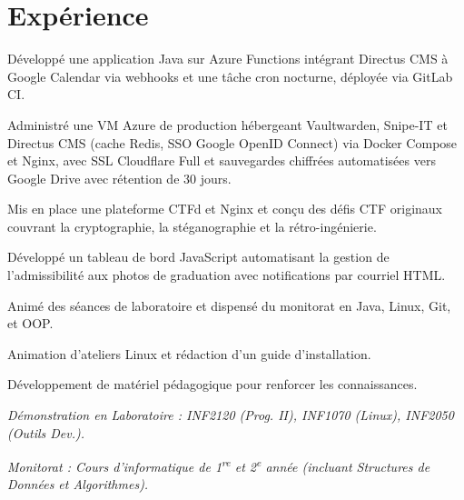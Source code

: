 \documentclass[letterpaper,10pt]{article}
\begin{document}
\section{Expérience}


\begin{resume_list}
\item Développé une application Java sur Azure Functions intégrant Directus CMS à Google Calendar via webhooks et une tâche cron nocturne, déployée via GitLab CI.
\item Administré une VM Azure de production hébergeant Vaultwarden, Snipe-IT et Directus CMS (cache Redis, SSO Google OpenID Connect) via Docker Compose et Nginx, avec SSL Cloudflare Full et sauvegardes chiffrées automatisées vers Google Drive avec rétention de 30 jours.
\item Mis en place une plateforme CTFd et Nginx et conçu des défis CTF originaux couvrant la cryptographie, la stéganographie et la rétro-ingénierie. {\footnotesize {}}
\item Développé un tableau de bord JavaScript automatisant la gestion de l'admissibilité aux photos de graduation avec notifications par courriel HTML.
\end{resume_list}

\begin{resume_list}
\item Animé des séances de laboratoire et dispensé du monitorat en Java, Linux, Git, et OOP.
\item Animation d'ateliers Linux et rédaction d'un guide d'installation. {\footnotesize {}}
\item Développement de matériel pédagogique pour renforcer les connaissances. {\footnotesize {}}
\item[] \textit{Démonstration en Laboratoire : INF2120 (Prog. II), INF1070 (Linux), INF2050 (Outils Dev.).}
\item[] \textit{Monitorat : Cours d'informatique de 1\textsuperscript{re} et 2\textsuperscript{e} année (incluant Structures de Données et Algorithmes).}
\end{resume_list}
\end{document}

